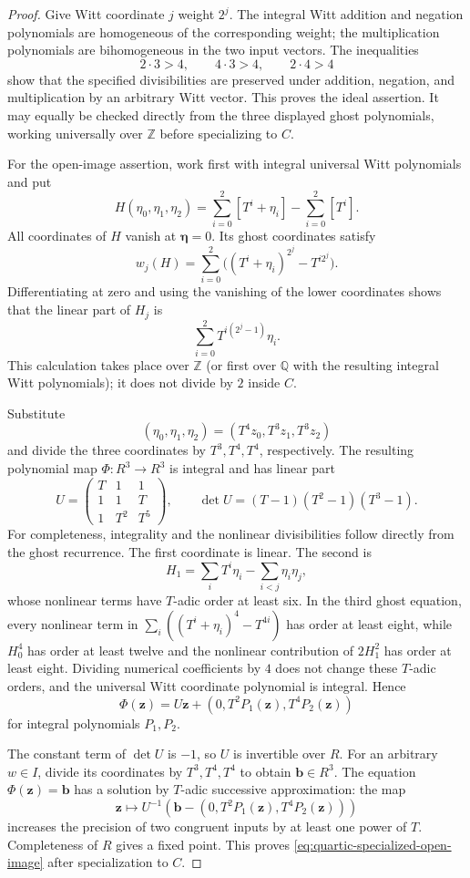 \documentclass[11pt]{amsart}
\theoremstyle{definition}
\numberwithin{equation}{section}
\begin{document}
\begin{proof}
Give Witt coordinate $j$ weight $2^j$.  The integral Witt addition
and negation polynomials are homogeneous of the corresponding weight;
the multiplication polynomials are bihomogeneous in the two input
vectors.  The inequalities
\[
 2\cdot3>4,\qquad4\cdot3>4,\qquad2\cdot4>4
\]
show that the specified divisibilities are preserved under addition,
negation, and multiplication by an arbitrary Witt vector.  This proves
the ideal assertion.  It may equally be checked directly from the
three displayed ghost polynomials, working universally over $\mathbb Z$
before specializing to $C$.

For the open-image assertion, work first with integral universal Witt
polynomials and put
\[
 H(\eta_0,\eta_1,\eta_2)
   =\sum_{i=0}^2[T^i+\eta_i]-\sum_{i=0}^2[T^i].
\]
All coordinates of $H$ vanish at $\boldsymbol\eta=0$.  Its ghost
coordinates satisfy
\[
 w_j(H)=\sum_{i=0}^2\bigl((T^i+\eta_i)^{2^j}-T^{i2^j}\bigr).
\]
Differentiating at zero and using the vanishing of the lower
coordinates shows that the linear part of $H_j$ is
\[
 \sum_{i=0}^2 T^{i(2^j-1)}\eta_i.
\]
This calculation takes place over $\mathbb Z$ (or first over
$\mathbb Q$ with the resulting integral Witt polynomials); it does
not divide by $2$ inside $C$.

Substitute
\[
 (\eta_0,\eta_1,\eta_2)=(T^4z_0,T^3z_1,T^3z_2)
\]
and divide the three coordinates by $T^3,T^4,T^4$, respectively.
The resulting polynomial map $\Phi:R^3\longrightarrow R^3$ is
integral and has linear part
\[
 U=\begin{pmatrix}
 T&1&1\\
 1&1&T\\
 1&T^2&T^5
 \end{pmatrix},\qquad
 \det U=(T-1)(T^2-1)(T^3-1).
\]
For completeness, integrality and the nonlinear divisibilities follow
directly from the ghost recurrence.  The first coordinate is linear.
The second is
\[
 H_1=\sum_iT^i\eta_i-\sum_{i<j}\eta_i\eta_j,
\]
whose nonlinear terms have $T$-adic order at least six.  In the third
ghost equation, every nonlinear term in
$\sum_i((T^i+\eta_i)^4-T^{4i})$ has order at least eight, while
$H_0^4$ has order at least twelve and the nonlinear contribution of
$2H_1^2$ has order at least eight.  Dividing numerical coefficients by
$4$ does not change these $T$-adic orders, and the universal Witt
coordinate polynomial is integral.  Hence
\[
 \Phi(\mathbf z)=U\mathbf z+(0,T^2P_1(\mathbf z),T^4P_2(\mathbf z))
\]
for integral polynomials $P_1,P_2$.

The constant term of $\det U$ is $-1$, so $U$ is invertible over $R$.
For an arbitrary $w\in I$, divide its coordinates by $T^3,T^4,T^4$
to obtain $\mathbf b\in R^3$.  The equation $\Phi(\mathbf z)=\mathbf b$
has a solution by $T$-adic successive approximation: the map
\[
 \mathbf z\longmapsto U^{-1}\!\left(
 \mathbf b-(0,T^2P_1(\mathbf z),T^4P_2(\mathbf z))\right)
\]
increases the precision of two congruent inputs by at least one
power of $T$.  Completeness of $R$ gives a fixed point.  This proves
\eqref{eq:quartic-specialized-open-image} after specialization to $C$.
\end{proof}
\end{document}
